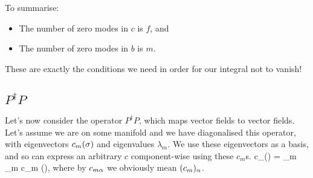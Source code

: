 To summarise:
\begin{itemize}
    \item The number of zero modes in $c$ is $f$, and 
    \item The number of zero modes in $b$ is $m$.
\end{itemize}
These are exactly the conditions we need in order for our integral not to vanish!

\subsection{$P^{\dagger}P$}

Let's now consider the operator $P^{\dagger}P$, which maps vector fields to vector fields. Let's assume we are on some manifold and we have diagonalised this operator, with eigenvectors $c_m(\sigma)$ and eigenvalues $\lambda_m$.  We use these eigenvectors as a basis, and so can express an arbitrary $c$ component-wise using these $c_m$s. 
\bse 
    c_{\a}(\sig) = \sum_m \gamma_m c_{m\a} (\sig),
\ese 
where by $c_{m\alpha}$ we obviously mean $(c_m)_{\alpha}$. 

